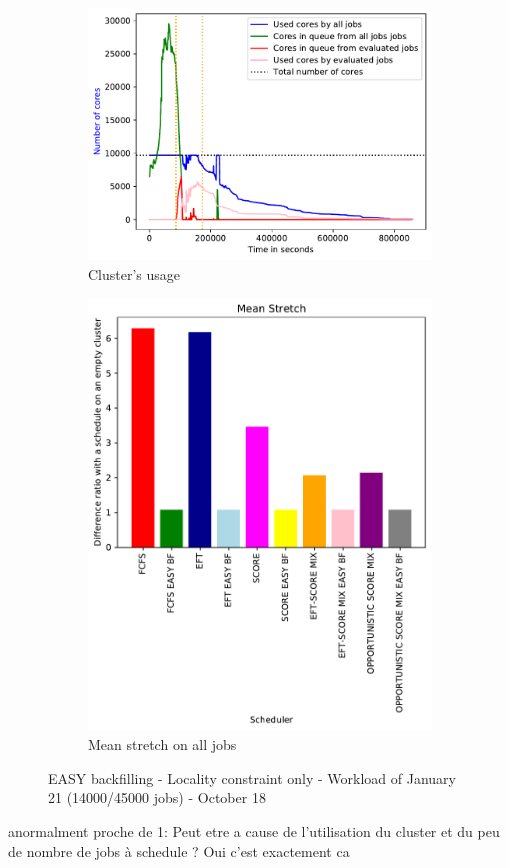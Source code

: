 \documentclass[a4paper]{article}
\begin{document}
\begin{figure}[H]\centering
\begin{subfigure}[b]{0.4\linewidth}\centering\includegraphics[width=1\linewidth]{MBSS/plot/2022-01-21->2022-01-21_V9271_Fcfs_Used_nodes_450_128_32_256_4_1024.pdf}\caption{Cluster's usage}\end{subfigure}
\begin{subfigure}[b]{0.4\linewidth}\centering\includegraphics[width=0.9\linewidth]{MBSS/plot/Results_FCFS_Score_Easy_Backfill_2022-01-21->2022-01-21_V9271_Mean_Stretch_450_128_32_256_4_1024.pdf}\caption{Mean stretch on all jobs}\end{subfigure}
\caption{EASY backfilling - Locality constraint only - Workload of January 21 (14000/45000 jobs) - October 18}\end{figure}
anormalment proche de 1: Peut etre a cause de l'utilisation du cluster et du peu de nombre de jobs à schedule ? Oui c'est exactement ca
\end{document}
